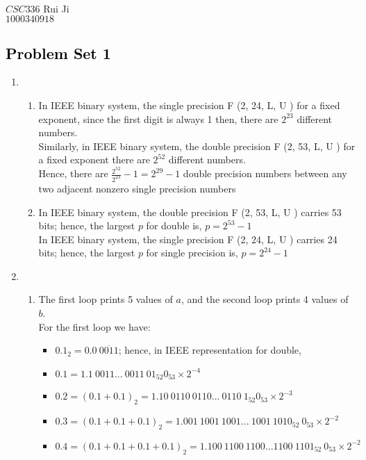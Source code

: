 \documentclass{article}
\begin{document}
\
\\
{\large $CSC336$}
\hfill{\large Rui Ji} \\
\null\hfill{\large $1000340918$}\\
\begin{center} 
\section*{\centering\textcolor{black} {Problem Set 1}}
\end{center}
\begin{enumerate}
\item 
	\begin{enumerate}
		\item In IEEE binary system, the single precision F (2, 24, L, U ) for a fixed exponent, since the first digit is always 1 then, there are $2^{23}$ different numbers. \\
			Similarly, in IEEE binary system, the double precision F (2, 53, L, U ) for a fixed exponent there are $2^{52}$ different numbers. \\
			Hence, there are $\frac{2^{52}}{2^{23}} - 1 = 2^{29} -1$ double precision numbers between any two adjacent nonzero single precision numbers
		\item In IEEE binary system, the double precision F (2, 53, L, U )  carries 53 bits;  hence, the largest $p$ for double is, $p =2^{53} -1$\\
			In IEEE binary system, the single precision F (2, 24, L, U )  carries 24 bits;  hence, the largest $p$ for single precision is, $p = 2^{24} -1$
	\end{enumerate}
\item 
	\begin{enumerate}
		\item The first loop prints 5 values of $a$, and the second loop prints 4 values of $b$.\\
			For the first loop we have:
			\begin{itemize} [label={}]
			 \item $0.1_2 =  0.0 \ \overline{0011}$; hence, in IEEE representation for double, 
			 \item $0.1 = 1.1 \ 0011...\ 0011 \ 01_{52} 0_{53} \times 2^{-4}$
			 \item $0.2 = (0.1+0.1)_2 = 1.10 \ 0110 \ 0110 ... \ 0110 \ 1_{52}0_{53} \times 2^{-3}$
			 \item $0.3 = (0.1+ 0.1+0.1)_2 = 1. 001 \ 1001 \ 1001 ... \ 1001 \ 1010_{52} \ 0_{53} \times 2^{-2}$
			 \item $0.4 = (0.1+0.1+0.1+0.1)_2 = 1.100 \ 1100 \ 1100 ... 1100\ 1101_{52} \ 0_{53} \times 2^{-2}$

\end{itemize}
\end{enumerate}
\end{enumerate}
\end{document}
